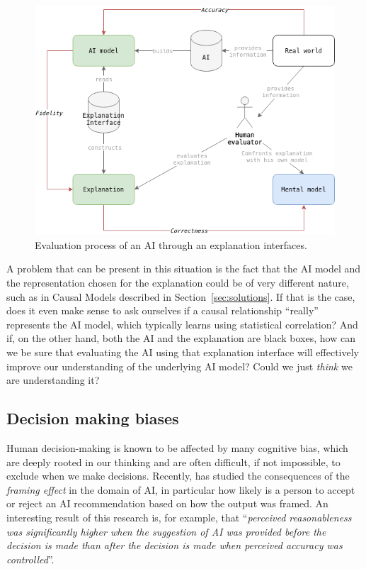 \documentclass[conference]{IEEEtran}
\begin{document}
\begin{figure}[ht!] \centering
    \includegraphics[width=\linewidth]{images/evaluation.png} \caption{Evaluation process of an AI through an explanation interfaces.} \label{fig:eval} \end{figure}

A problem that can be present in this situation is the fact that the AI model and the representation chosen for the explanation could be of very different nature, such as in Causal Models described in Section~\ref{sec:solutions}. If that is the case, does it even make sense to ask ourselves if a causal relationship ``really'' represents the AI model, which typically learns using statistical correlation? And if, on the other hand, both the AI and the explanation are black boxes, how can we be sure that evaluating the AI using that explanation interface will effectively improve our understanding of the underlying AI model? Could we just \textit{think} we are understanding it?

\subsection{Decision making biases}
\label{sec:bias}

Human decision-making is known to be affected by many cognitive bias, which are deeply rooted in our thinking and are often difficult, if not impossible, to exclude when we make decisions. Recently, \citet{framingeffect} has studied the consequences of the \textit{framing effect} in the domain of AI, in particular how likely is a person to accept or reject an AI recommendation based on how the output was framed. An interesting result of this research is, for example, that ``\textit{perceived reasonableness was significantly higher when the suggestion of AI was provided before the decision is made than after the decision is made when perceived accuracy was controlled}''.
\end{document}
